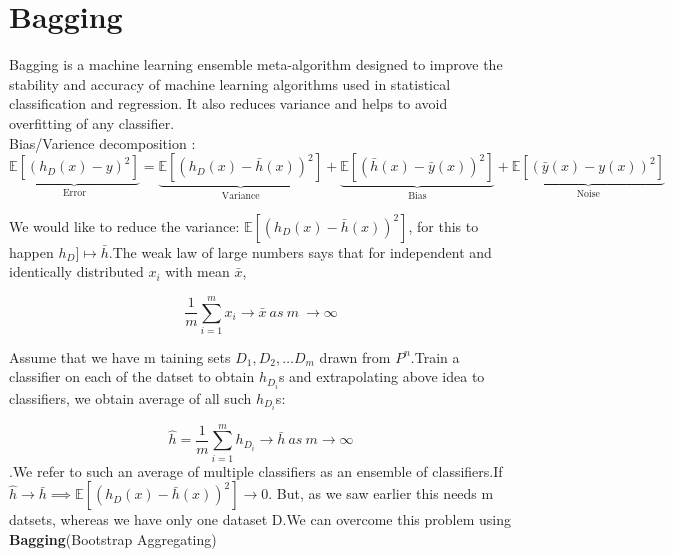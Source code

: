 \documentclass[12pt]{article}
\begin{document}
 
 
 
 
 
 
 
 
 
 
 
 
 
 
 
 
 
 
 
 
 
 
 
 
 
 
 
 
 \section{Bagging}
 
 Bagging is a machine learning ensemble meta-algorithm designed to improve the stability and accuracy of machine learning algorithms used in statistical classification and regression. It also reduces variance and helps to avoid overfitting of any classifier. \\ Bias/Varience decomposition :
 $$\underbrace{\mathbb{E}[(h_{D}(x)-y)^{2}]}_\text{Error} = \underbrace{\mathbb{E}[(h_{D}(x) - \bar{h}(x))^{2}]}_\text{Variance} + \underbrace{\mathbb{E}[(\bar{h}(x) - \bar{y}(x))^{2}] }_\text{Bias} + \underbrace{\mathbb{E}[(\bar{y}(x)- y(x))^{2}]}_\text{Noise} $$
 
 
We would like to reduce the variance: ${\mathbb{E}[(h_{D}(x) - \bar{h}(x))^{2}]}$, for this to happen $h_{D} ] \mapsto \bar{h}$.The weak law of large numbers says that for independent and identically distributed $x_{i}$ with mean $\bar{x}$,
 
 $$\frac{1}{m} \sum_{i=1}^{m}x_{i} \rightarrow \bar{x} \ as \ m \ \rightarrow \infty$$
 
Assume that we have m taining sets $D_{1}, D_{2}, \dots D_{m}$ drawn from $P^{n}$.Train a classifier on each of the datset to obtain $h_{D_{i}}$s and extrapolating above idea to classifiers, we obtain  average of all such $h_{D_{i}}$s:

$$\hat{h} = \frac{1}{m} \sum_{i=1}^{m}h_{D_{i}} \rightarrow \bar{h} \ as \ m \rightarrow \infty$$.We refer to such an average of multiple classifiers as an ensemble of classifiers.If $\hat{h} \rightarrow \bar{h} \implies {\mathbb{E}[(h_{D}(x) - \bar{h}(x))^{2}]} \rightarrow 0$. But, as we saw earlier this needs m datsets, whereas we have only one dataset D.We can overcome this problem using \textbf{Bagging}(Bootstrap Aggregating)
 
\end{document}
